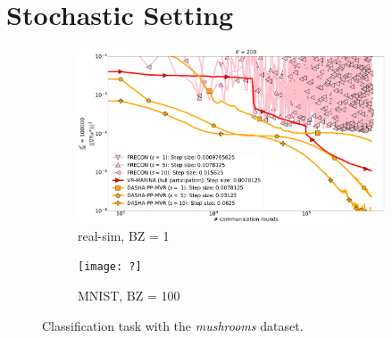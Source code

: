 \documentclass{article}
\begin{document}
\section*{Stochastic Setting}
\begin{figure}[h]
    \begin{subfigure}{.5\textwidth}
        \includegraphics[width=\textwidth]{neurips_2022_stochastic_real-sim_nof_200_numnodes_10_probs_mega_batch_100000_fix_nm_bug.pdf}
        \caption{real-sim, BZ = 1}
    \end{subfigure}
    \begin{subfigure}{.5\textwidth}
        \texttt{[image: ?]}
        \caption{MNIST, BZ = 100}
    \end{subfigure}
\caption{Classification task with the \textit{mushrooms} dataset.}
\label{fig:finite-sum-mnist}
\end{figure}
\end{document}
